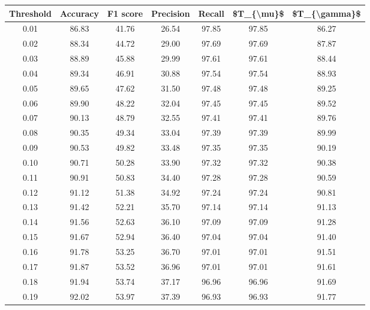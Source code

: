 \begin{tabular}{|c|c|c|c|c|c|c|}
\hline
 Threshold &  Accuracy &  F1 score &  Precision &  Recall &  \$T\_\{\textbackslash mu\}\$ &  \$T\_\{\textbackslash gamma\}\$ \\
\hline
      0.01 &     86.83 &     41.76 &      26.54 &   97.85 &      97.85 &         86.27 \\
      0.02 &     88.34 &     44.72 &      29.00 &   97.69 &      97.69 &         87.87 \\
      0.03 &     88.89 &     45.88 &      29.99 &   97.61 &      97.61 &         88.44 \\
      0.04 &     89.34 &     46.91 &      30.88 &   97.54 &      97.54 &         88.93 \\
      0.05 &     89.65 &     47.62 &      31.50 &   97.48 &      97.48 &         89.25 \\
      0.06 &     89.90 &     48.22 &      32.04 &   97.45 &      97.45 &         89.52 \\
      0.07 &     90.13 &     48.79 &      32.55 &   97.41 &      97.41 &         89.76 \\
      0.08 &     90.35 &     49.34 &      33.04 &   97.39 &      97.39 &         89.99 \\
      0.09 &     90.53 &     49.82 &      33.48 &   97.35 &      97.35 &         90.19 \\
      0.10 &     90.71 &     50.28 &      33.90 &   97.32 &      97.32 &         90.38 \\
      0.11 &     90.91 &     50.83 &      34.40 &   97.28 &      97.28 &         90.59 \\
      0.12 &     91.12 &     51.38 &      34.92 &   97.24 &      97.24 &         90.81 \\
      0.13 &     91.42 &     52.21 &      35.70 &   97.14 &      97.14 &         91.13 \\
      0.14 &     91.56 &     52.63 &      36.10 &   97.09 &      97.09 &         91.28 \\
      0.15 &     91.67 &     52.94 &      36.40 &   97.04 &      97.04 &         91.40 \\
      0.16 &     91.78 &     53.25 &      36.70 &   97.01 &      97.01 &         91.51 \\
      0.17 &     91.87 &     53.52 &      36.96 &   97.01 &      97.01 &         91.61 \\
      0.18 &     91.94 &     53.74 &      37.17 &   96.96 &      96.96 &         91.69 \\
      0.19 &     92.02 &     53.97 &      37.39 &   96.93 &      96.93 &         91.77 \\

\end{tabular}

